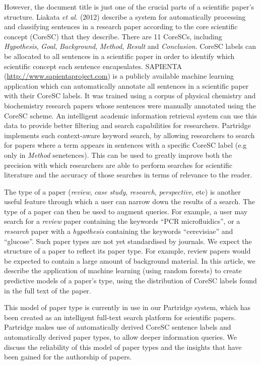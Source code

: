 \documentclass{svmult}
\begin{document}
However, the document title is just one of the crucial parts of a scientific
paper's structure.  Liakata \emph{et al.} (2012) describe a system for
automatically processing and classifying sentences in a research paper
according to the core scientific concept (CoreSC) that they
describe\cite{Liakata2012}.  There are 11 CoreSCs, including {\em Hypothesis},
{\em Goal}, {\it Background}, {\em Method}, {\em Result} and {\em Conclusion}.
CoreSC labels can be allocated to all sentences in a scientific paper in order
to identify which scientific concept each sentence encapsulates.  SAPIENTA
(\url{http://www.sapientaproject.com}) is a publicly available machine learning
application which can automatically annotate all sentences in a scientific
paper with their CoreSC labels. It was trained using a corpus of physical
chemistry and biochemistry research papers whose sentences were manually
annotated using the CoreSC\cite{LIAKATA10.644} scheme.  An intelligent academic
information retrieval system can use this data to provide better filtering and
search capabilities for researchers.  Partridge implements such context-aware
keyword search, by allowing researchers to search for papers where a term
appears in sentences with a specific CoreSC label (e.g only in {\em Method}
senetences). This can be used to greatly improve both the precision with which
researchers are able to perform searches for scientific literature and the
accuracy of those searches in terms of relevance to the reader.

The type of a paper ({\em review}, {\em case study}, {\em research}, {\em
perspective}, etc) is another useful feature through which a user can narrow
down the results of a search.  The type of a paper can then be used to augment
queries.  For example, a user may search for a {\em review} paper containing
the keywords ``PCR microfluidics'', or a {\em research} paper with a {\em
hypothesis} containing the keywords ``cerevisiae'' and ``glucose''.   Such
paper types are not yet standardised by journals.  We expect the structure of a
paper to reflect its paper type.  For example, review papers would be expected
to contain a large amount of background material.  In this article, we describe
the application of machine learning (using random forests) to create predictive
models of a paper's type, using the distribution of CoreSC labels found in the
full text of the paper. 

This model of paper type is currently in use in our Partridge system, which has
been created as an intelligent full-text search platform for scientific papers.
Partridge makes use of automatically derived CoreSC sentence labels and
automatically derived paper types, to allow deeper information queries.  We
discuss the reliability of this model of paper types and the insights that have
been gained for the authorship of papers.
\end{document}
